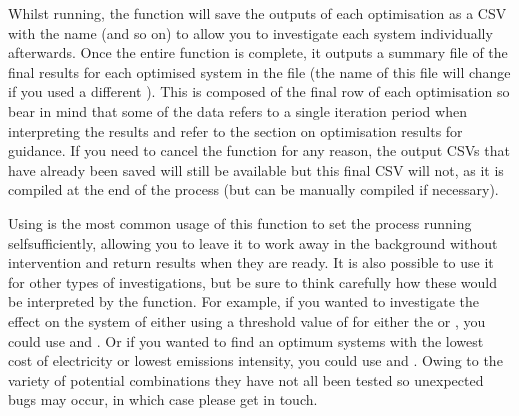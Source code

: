 \documentclass[letterpaper,10pt,english]{sphinxmanual}
\begin{document}
\sphinxAtStartPar
Whilst running, the function will save the outputs of each optimisation
as a CSV with the name  (and so on) to
allow you to investigate each system individually afterwards. Once the
entire function is complete, it outputs a summary file of the final
results for each optimised system in the file
 (the name of this
file will change if you used a different ). This is
composed of the final row of each optimisation so bear in mind that some
of the data refers to a single iteration period when interpreting the
results and refer to the section on optimisation results for guidance. If you
need to cancel the function for any reason, the output CSVs that have
already been saved will still be available but this final CSV will not,
as it is compiled at the end of the process (but can be manually
compiled if necessary).

\sphinxAtStartPar
Using  is the most common usage of this
function to set the process running self\sphinxhyphen{}sufficiently, allowing you to
leave it to work away in the background without intervention and return
results when they are ready. It is also possible to use it for other
types of investigations, but be sure to think carefully how these would
be interpreted by the function. For example, if you wanted to
investigate the effect on the system of either using a threshold value
of  for either the  or ,
you could use  and
. Or if you
wanted to find an optimum systems with the lowest cost of electricity or
lowest emissions intensity, you could use
 and
.
Owing to the variety of potential combinations they have not all been
tested so unexpected bugs may occur, in which case please get in touch.
\end{document}
